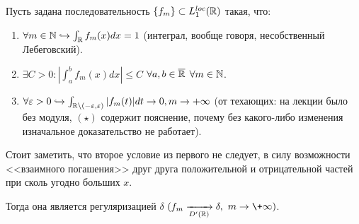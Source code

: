 \begin{theorem}
    Пусть задана последовательность $\{f_m\} \subset L_1^{loc}(\mathbb{R})$ такая, что:
    \begin{enumerate}
        \item $\forall m \in \mathbb{N} \hookrightarrow \int_{\mathbb{R}} f_m(x) dx = 1$ (интеграл, вообще говоря, несобственный Лебеговский).
        
        \item $\exists C > 0 : |\int_a^b f_m(x)dx| \leq C$ $\forall a, b \in \overline{\mathbb{R}}$ $\forall m \in \mathbb{N}$.
        
        \item $\forall \varepsilon > 0 \hookrightarrow \int_{\mathbb{R} \setminus (-\varepsilon, \varepsilon)} |f_m(t)|dt \rightarrow 0, m \rightarrow +\infty$ (от техающих: на лекции было без модуля, $(\star)$ содержит пояснение, почему без какого-либо изменения изначальное доказательство не работает).
    \end{enumerate}
    \begin{note}
        Стоит заметить, что второе условие из первого не следует, в силу возможности <<взаимного погашения>> друг друга положительной и отрицательной частей при сколь угодно больших $x$.
    \end{note}
    Тогда она является регуляризацией $\delta$ $(f_m \xrightarrow[D'(\mathbb{R})]{} \delta,$ $m \ra \+\infty)$.
\end{theorem}
